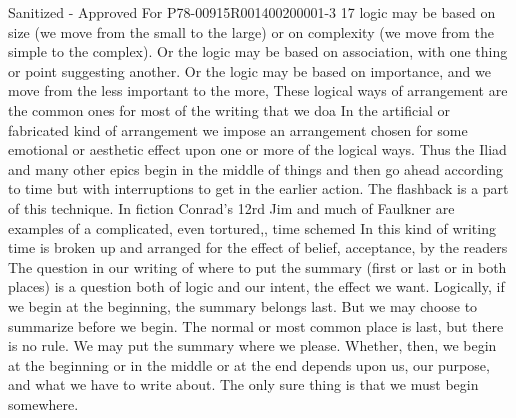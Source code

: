 \documentclass[
    oneside,
    11pt,
    draft
]{memoir}
\begin{document}
Sanitized - Approved For P78-00915R001400200001-3 17 logic may be based on size (we move from the small to the large) or on complexity (we move from the simple to the complex). Or the logic may be based on association, with one thing or point suggesting another. Or the logic may be based on importance, and we move from the less important to the more, These logical ways of arrangement are the common ones for most of the writing that we doa In the artificial or fabricated kind of arrangement we impose an arrangement chosen for some emotional or aesthetic effect upon one or more of the logical ways. Thus the Iliad and many other epics begin in the middle of things and then go ahead according to time but with interruptions to get in the earlier action. The flashback is a part of this technique. In fiction Conrad's 12rd Jim and much of Faulkner are examples of a complicated, even tortured,, time schemed In this kind of writing time is broken up and arranged for the effect of belief, acceptance, by the readers The question in our writing of where to put the summary (first or last or in both places) is a question both of logic and our intent, the effect we want. Logically, if we begin at the beginning, the summary belongs last. But we may choose to summarize before we begin. The normal or most common place is last, but there is no rule. We may put the summary where we please. Whether, then, we begin at the beginning or in the middle or at the end depends upon us, our purpose, and what we have to write about. The only sure thing is that we must begin somewhere.
\end{document}
